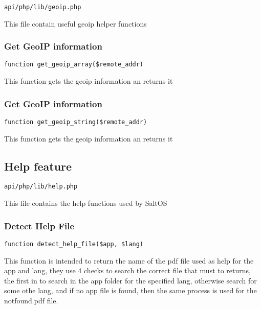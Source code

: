 \documentclass[a4paper]{article}
\begin{document}
\begin{lstlisting}
api/php/lib/geoip.php
\end{lstlisting}

This file contain useful geoip helper functions

\hypertarget{toc457}{}
\subsubsection{Get GeoIP information}

\begin{lstlisting}
function get_geoip_array($remote_addr)
\end{lstlisting}

This function gets the geoip information an returns it

\hypertarget{toc458}{}
\subsubsection{Get GeoIP information}

\begin{lstlisting}
function get_geoip_string($remote_addr)
\end{lstlisting}

This function gets the geoip information an returns it

\hypertarget{toc459}{}
\subsection{Help feature}

\begin{lstlisting}
api/php/lib/help.php
\end{lstlisting}

This file contains the help functions used by SaltOS

\hypertarget{toc460}{}
\subsubsection{Detect Help File}

\begin{lstlisting}
function detect_help_file($app, $lang)
\end{lstlisting}

This function is intended to return the name of the pdf file used as help
for the app and lang, they use 4 checks to search the correct file that must
to returns, the first in to search in the app folder for the specified lang,
otherwise search for some othe lang, and if no app file is found, then the
same process is used for the notfound.pdf file.
\end{document}
